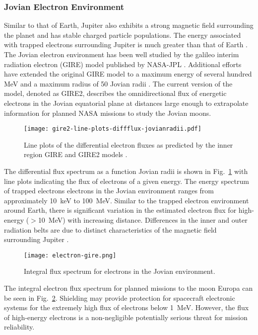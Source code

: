 \subsubsection{Jovian Electron Environment} %
\label{sub:jovian_environment}
Similar to that of Earth, Jupiter also exhibits a strong magnetic field surrounding the planet and has stable charged particle populations.
The energy associated with trapped electrons surrounding Jupiter is much greater than that of Earth \cite{divine1983charged,garrett2012galileo}.
The Jovian electron environment has been well studied by the galileo interim radiation electron (GIRE) model published by NASA-JPL \cite{divine1983charged}.
Additional efforts have extended the original GIRE model to a maximum energy of several hundred MeV and a maximum radius of 50 Jovian radii \cite{garrett2003galileo,garrett2005revised}.
The current version of the model, denoted as GIRE2, describes the omnidirectional flux of energetic electrons in the Jovian equatorial plane at distances large enough to extrapolate information for planned NASA missions to study the Jovian moons.

\begin{figure}[htbp]
    \begin{center}
        \texttt{[image: gire2-line-plots-diffflux-jovianradii.pdf]}
    \end{center}
    \caption[Line plots of the differential electron fluxes as predicted by the inner region GIRE and GIRE2 models.]{Line plots of the differential electron fluxes as predicted by the inner region GIRE and GIRE2 models \cite{garrett2012galileo}.}
    \label{fig:gire2-diff-flux}
\end{figure}
The differential flux spectrum as a function Jovian radii is shown in Fig.~\ref{fig:gire2-diff-flux} with line plots indicating the flux of electrons of a given energy.
The energy spectrum of trapped electrons electrons in the Jovian environment ranges from approximately 10~keV to 100~MeV.
Similar to the trapped electron environment around Earth, there is significant variation in the estimated electron flux for high-energy ($>$10~MeV) with increasing distance.
Differences in the inner and outer radiation belts are due to distinct characteristics of the magnetic field surrounding Jupiter \cite{garrett2012galileo}. 
\begin{figure}[htbp]
    \begin{center}
        \texttt{[image: electron-gire.png]}
    \end{center}
    \caption{Integral flux spectrum for electrons in the Jovian environment.}
    \label{fig:jovian-int-flux-spectrum}
\end{figure}
The integral electron flux spectrum for planned missions to the moon Europa can be seen in Fig.~\ref{fig:jovian-int-flux-spectrum}.
Shielding may provide protection for spacecraft electronic systems for the extremely high flux of electrons below 1~MeV. 
However, the flux of high-energy electrons is a non-negligible potentially serious threat for mission reliability. 

